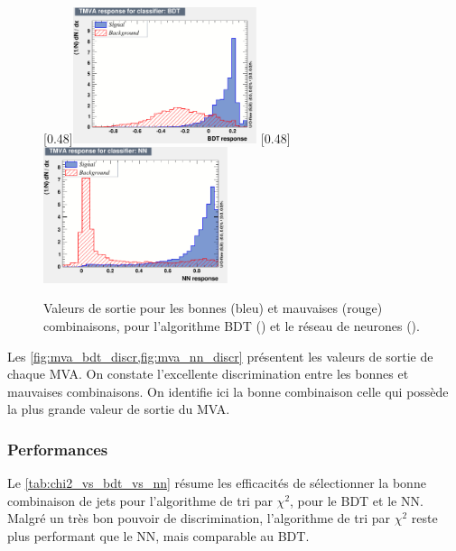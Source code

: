 \bigskip

\begin{figure}[tbp] \centering
    \subcaptionbox{\label{fig:mva_bdt_discr}}[0.48\textwidth]{\includegraphics[width=0.48\textwidth]{chapitre6/figs/mva/mva_BDT.pdf}}
    \subcaptionbox{\label{fig:mva_nn_discr}}[0.48\textwidth]{\includegraphics[width=0.48\textwidth]{chapitre6/figs/mva/mva_NN.pdf}}
    \caption{Valeurs de sortie pour les bonnes (bleu) et mauvaises (rouge) combinaisons, pour l'algorithme BDT () et le réseau de neurones ().}
\end{figure}

Les \cref{fig:mva_bdt_discr,fig:mva_nn_discr} présentent les valeurs de sortie de chaque MVA. On constate l'excellente discrimination entre les bonnes et mauvaises combinaisons. On identifie ici la bonne combinaison celle qui possède la plus grande valeur de sortie du MVA.

\subsubsection{Performances}

Le \cref{tab:chi2_vs_bdt_vs_nn} résume les efficacités de sélectionner la bonne combinaison de jets pour l'algorithme de tri par $\chi^2$, pour le BDT et le NN. Malgré un très bon pouvoir de discrimination, l'algorithme de tri par $\chi^2$ reste plus performant que le NN, mais comparable au BDT.

